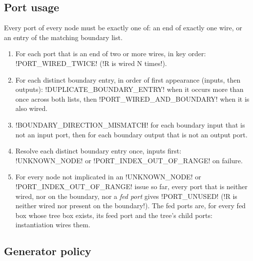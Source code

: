 \subsection{Port usage}\label{sec:diagrams-validate-usage}

Every port of every node must be exactly one of: an end of exactly one wire, or an entry of the matching boundary list.
\begin{enumerate}
\item For each port that is an end of two or more wires, in key order: \code!PORT_WIRED_TWICE! (\code!R is wired N times!).
\item For each distinct boundary entry, in order of first appearance (inputs, then outputs): \code!DUPLICATE_BOUNDARY_ENTRY! when it occurs more than once across both lists, then \code!PORT_WIRED_AND_BOUNDARY! when it is also wired.
\item \code!BOUNDARY_DIRECTION_MISMATCH! for each boundary input that is not an input port, then for each boundary output that is not an output port.
\item Resolve each distinct boundary entry once, inputs first: \code!UNKNOWN_NODE! or \code!PORT_INDEX_OUT_OF_RANGE! on failure.
\item For every node not implicated in an \code!UNKNOWN_NODE! or \code!PORT_INDEX_OUT_OF_RANGE! issue so far, every port that is neither wired, nor on the boundary, nor a \emph{fed port} gives \code!PORT_UNUSED! (\code!R is neither wired nor present on the boundary!). The fed ports are, for every fed box whose tree box exists, its feed port and the tree's child ports: instantiation wires them.
\end{enumerate}

\subsection{Generator policy}\label{sec:diagrams-validate-policy}

